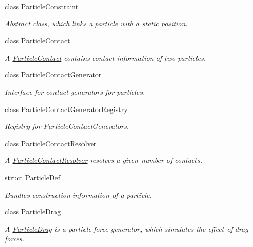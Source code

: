 \begin{DoxyCompactItemize}
class \mbox{\hyperlink{classr3_1_1_particle_constraint}{Particle\+Constraint}}
\begin{DoxyCompactList}\small\item\em Abstract class, which links a particle with a static position. \end{DoxyCompactList}\item 
class \mbox{\hyperlink{classr3_1_1_particle_contact}{Particle\+Contact}}
\begin{DoxyCompactList}\small\item\em A \mbox{\hyperlink{classr3_1_1_particle_contact}{Particle\+Contact}} contains contact information of two particles. \end{DoxyCompactList}\item 
class \mbox{\hyperlink{classr3_1_1_particle_contact_generator}{Particle\+Contact\+Generator}}
\begin{DoxyCompactList}\small\item\em Interface for contact generators for particles. \end{DoxyCompactList}\item 
class \mbox{\hyperlink{classr3_1_1_particle_contact_generator_registry}{Particle\+Contact\+Generator\+Registry}}
\begin{DoxyCompactList}\small\item\em Registry for Particle\+Contact\+Generators. \end{DoxyCompactList}\item 
class \mbox{\hyperlink{classr3_1_1_particle_contact_resolver}{Particle\+Contact\+Resolver}}
\begin{DoxyCompactList}\small\item\em A \mbox{\hyperlink{classr3_1_1_particle_contact_resolver}{Particle\+Contact\+Resolver}} resolves a given number of contacts. \end{DoxyCompactList}\item 
struct \mbox{\hyperlink{structr3_1_1_particle_def}{Particle\+Def}}
\begin{DoxyCompactList}\small\item\em Bundles construction information of a particle. \end{DoxyCompactList}\item 
class \mbox{\hyperlink{classr3_1_1_particle_drag}{Particle\+Drag}}
\begin{DoxyCompactList}\small\item\em A \mbox{\hyperlink{classr3_1_1_particle_drag}{Particle\+Drag}} is a particle force generator, which simulates the effect of drag forces. \end{DoxyCompactList}\item 

\end{DoxyCompactItemize}
